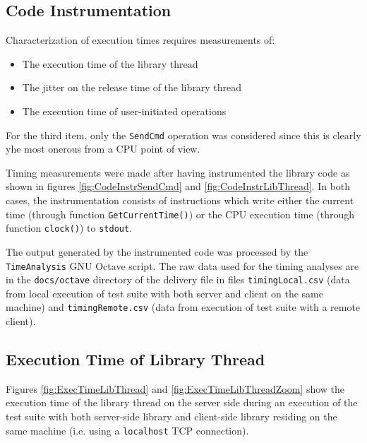 \documentclass{pnp_article}
\begin{document}
{%
\subsection{Code Instrumentation}\label{sec:svrCodeInstrumentation}
Characterization of execution times requires measurements of: 

\begin{itemize}
\item The execution time of the library thread
\item The jitter on the release time of the library thread
\item The execution time of user-initiated operations
\end{itemize}

For the third item, only the \texttt{SendCmd} operation was considered since this is clearly yhe most onerous from a CPU point of view. 

Timing measurements were made after having instrumented the library code as shown in figures \ref{fig:CodeInstrSendCmd} and \ref{fig:CodeInstrLibThread}. In both cases, the instrumentation consists of instructions which write either the current time (through function \texttt{GetCurrentTime()}) or the CPU execution time (through function \texttt{clock()}) to \texttt{stdout}.

The output generated by the instrumented code was processed by the \texttt{TimeAnalysis} GNU Octave script. The raw data used for the timing analyses are in the \texttt{docs/octave} directory of the delivery file in files \texttt{timingLocal.csv} (data from local execution of test suite with both server and client on the same machine) and \texttt{timingRemote.csv} (data from execution of test suite with a remote client).



\subsection{Execution Time of Library Thread}\label{sec:svrExecTimeLibThread}
Figures \ref{fig:ExecTimeLibThread} and \ref{fig:ExecTimeLibThreadZoom} show the execution time of the library thread on the server side during an execution of the test suite with both server-side library and client-side library residing on the same machine (i.e. using a \texttt{localhost} TCP connection). 

}
\end{document}
